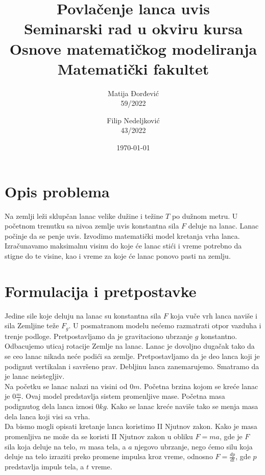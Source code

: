\documentclass[a4paper]{article}
\begin{document}
\title{\huge Povlačenje lanca uvis\\ \vskip 0.2in \large{Seminarski rad u okviru kursa\\ Osnove matematičkog modeliranja\\ Matematički fakultet} \vskip 5.0in}

\author{
Matija Đorđević\\
59/2022
\and
Filip Nedeljković\\
43/2022
}
\date{\today}
\maketitle
\newpage


\section{Opis problema}
Na zemlji leži sklupčan lanac velike dužine i težine $T$ po dužnom metru. U početnom trenutku sa
nivoa zemlje uvis konstantna sila $F$ deluje na lanac. Lanac počinje da se penje uvis.
Izvodimo matematički model kretanja vrha lanca. \\
Izračunavamo maksimalnu visinu do koje će lanac stići i vreme potrebno da stigne do te visine, kao 
i vreme za koje će lanac ponovo pasti na zemlju. \\

\section{Formulacija i pretpostavke}

Jedine sile koje deluju na lanac su konstantna sila $F$  koja vuče vrh lanca 
naviše i sila Zemljine teže $F_{g}$. U posmatranom modelu nećemo razmatrati
otpor vazduha i trenje podloge. Pretpostavljamo da je gravitaciono
ubrzanje $g$ konstantno. Odbacujemo uticaj rotacije Zemlje na lanac.
Lanac je dovoljno dugačak tako da se ceo lanac nikada neće podići
sa zemlje. Pretpostavljamo da je deo lanca koji je podignut
vertikalan i savršeno prav. Debljinu lanca zanemarujemo.
Smatramo da je lanac neistegljiv.\\
Na početku  se lanac nalazi na visini od $0m$. Početna brzina 
kojom se kreće lanac je $0\frac{m}{s}$. 
Ovaj model predstavlja sistem promenljive mase.\cite{de2012falling}
Početna masa podignutog dela lanca iznosi $0kg$. 
Kako se lanac kreće naviše tako se menja masa dela lanca koji visi sa vrha.\\
Da bismo mogli opisati kretanje lanca koristimo II Njutnov zakon.
Kako je masa promenljiva ne može da se koristi II Njutnov zakon
u obliku $F=ma$, gde je $F$ sila koja deluje na telo, $m$ masa tela, a
$a$ njegovo ubrzanje, nego ćemo silu koja deluje na telo izraziti 
preko promene impulsa kroz vreme, odnosno $F=\frac{dp}{dt}$, gde 
$p$ predstavlja impuls tela, a $t$ vreme.\cite{urone2020physics}
\end{document}

